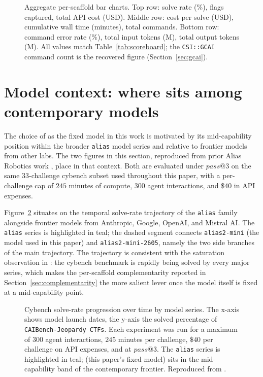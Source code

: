 \begin{figure}[t]
\centering
\resizebox{0.92\textwidth}{!}{}
\caption{Aggregate per-scaffold bar charts. Top row: solve rate (\%), flags captured, total API cost (USD). Middle row: cost per solve (USD), cumulative wall time (minutes), total commands. Bottom row: command error rate (\%), total input tokens (M), total output tokens (M). All values match Table~\ref{tab:scoreboard}; the \texttt{CSI::GCAI} command count is the recovered figure (Section~\ref{sec:gcai}).}
\label{fig:aggregate-charts}
\end{figure}

\FloatBarrier
\section{Model context: where \aliasmini{} sits among contemporary models}\label{app:model-context}

The choice of \aliasmini{} as the fixed model in this work is motivated by its mid-capability position within the broader \texttt{alias} model series and relative to frontier models from other labs. The two figures in this section, reproduced from prior Alias Robotics work \cite{mayoralvilchescybersuper2026}, place \aliasmini{} in that context. Both are evaluated under $pass@3$ on the same 33-challenge cybench subset used throughout this paper, with a per-challenge cap of $245$ minutes of compute, $300$ agent interactions, and $\$40$ in API expenses.

Figure~\ref{fig:alias-progression} situates \aliasmini{} on the temporal solve-rate trajectory of the \texttt{alias} family alongside frontier models from Anthropic, Google, OpenAI, and Mistral AI. The \texttt{alias} series is highlighted in teal; the dashed segment connects \texttt{alias2-mini} (the model used in this paper) and \texttt{alias2-mini-2605}, namely the two side branches of the main trajectory. The trajectory is consistent with the saturation observation in \cite{mayoralvilchescybersuper2026}: the cybench benchmark is rapidly being solved by every major series, which makes the per-scaffold complementarity reported in Section~\ref{sec:complementarity} the more salient lever once the model itself is fixed at a mid-capability point.

\begin{figure}[t]
\centering
\resizebox{\textwidth}{!}{}
\caption{Cybench solve-rate progression over time by model series. The x-axis shows model launch dates, the y-axis the solved percentage of \texttt{CAIBench-Jeopardy CTFs}. Each experiment was run for a maximum of $300$ agent interactions, $245$ minutes per challenge, $\$40$ per challenge on API expenses, and at $pass@3$. The \texttt{alias} series is highlighted in teal; \aliasmini{} (this paper's fixed model) sits in the mid-capability band of the contemporary frontier. Reproduced from \cite{mayoralvilchescybersuper2026}.}
\label{fig:alias-progression}
\end{figure}

